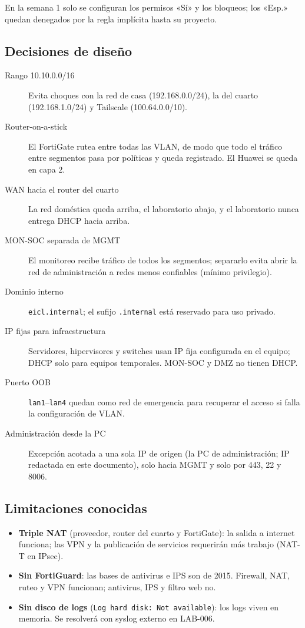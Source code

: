 \documentclass[11pt,a4paper]{article}
\begin{document}
En la semana 1 solo se configuran los permisos «Sí» y los bloqueos; los «Esp.» quedan denegados por la regla implícita hasta su proyecto.

\subsection{Decisiones de diseño}

\begin{description}
  \item[Rango 10.10.0.0/16] Evita choques con la red de casa (192.168.0.0/24), la del cuarto (192.168.1.0/24) y Tailscale (100.64.0.0/10).
  \item[Router-on-a-stick] El FortiGate rutea entre todas las VLAN, de modo que todo el tráfico entre segmentos pasa por políticas y queda registrado. El Huawei se queda en capa 2.
  \item[WAN hacia el router del cuarto] La red doméstica queda arriba, el laboratorio abajo, y el laboratorio nunca entrega DHCP hacia arriba.
  \item[MON-SOC separada de MGMT] El monitoreo recibe tráfico de todos los segmentos; separarlo evita abrir la red de administración a redes menos confiables (mínimo privilegio).
  \item[Dominio interno] \texttt{eicl.internal}; el sufijo \texttt{.internal} está reservado para uso privado.
  \item[IP fijas para infraestructura] Servidores, hipervisores y switches usan IP fija configurada en el equipo; DHCP solo para equipos temporales. MON-SOC y DMZ no tienen DHCP.
  \item[Puerto OOB] \texttt{lan1}--\texttt{lan4} quedan como red de emergencia para recuperar el acceso si falla la configuración de VLAN.
  \item[Administración desde la PC] Excepción acotada a una sola IP de origen (la PC de administración; IP redactada en este documento), solo hacia MGMT y solo por 443, 22 y 8006.
\end{description}

\subsection{Limitaciones conocidas}

\begin{itemize}
  \item \textbf{Triple NAT} (proveedor, router del cuarto y FortiGate): la salida a internet funciona; las VPN y la publicación de servicios requerirán más trabajo (NAT-T en IPsec).
  \item \textbf{Sin FortiGuard}: las bases de antivirus e IPS son de 2015. Firewall, NAT, ruteo y VPN funcionan; antivirus, IPS y filtro web no.
  \item \textbf{Sin disco de logs} (\texttt{Log hard disk: Not available}): los logs viven en memoria. Se resolverá con syslog externo en LAB-006.
\end{itemize}
\end{document}

